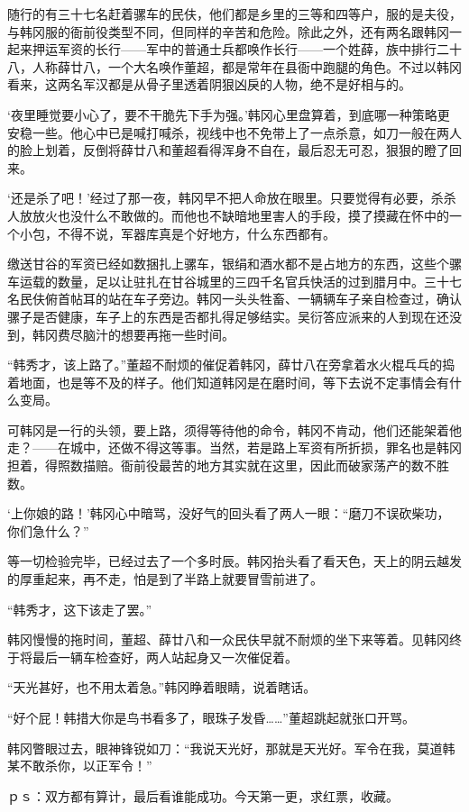 随行的有三十七名赶着骡车的民伕，他们都是乡里的三等和四等户，服的是夫役，与韩冈服的衙前役类型不同，但同样的辛苦和危险。除此之外，还有两名跟韩冈一起来押运军资的长行——军中的普通士兵都唤作长行——一个姓薛，族中排行二十八，人称薛廿八，一个大名唤作董超，都是常年在县衙中跑腿的角色。不过以韩冈看来，这两名军汉都是从骨子里透着阴狠凶戾的人物，绝不是好相与的。

‘夜里睡觉要小心了，要不干脆先下手为强。’韩冈心里盘算着，到底哪一种策略更安稳一些。他心中已是喊打喊杀，视线中也不免带上了一点杀意，如刀一般在两人的脸上划着，反倒将薛廿八和董超看得浑身不自在，最后忍无可忍，狠狠的瞪了回来。

‘还是杀了吧！’经过了那一夜，韩冈早不把人命放在眼里。只要觉得有必要，杀杀人放放火也没什么不敢做的。而他也不缺暗地里害人的手段，摸了摸藏在怀中的一个小包，不得不说，军器库真是个好地方，什么东西都有。

缴送甘谷的军资已经如数捆扎上骡车，银绢和酒水都不是占地方的东西，这些个骡车运载的数量，足以让驻扎在甘谷城里的三四千名官兵快活的过到腊月中。三十七名民伕俯首帖耳的站在车子旁边。韩冈一头头牲畜、一辆辆车子亲自检查过，确认骡子是否健康，车子上的东西是否都扎得足够结实。吴衍答应派来的人到现在还没到，韩冈费尽脑汁的想要再拖一些时间。

“韩秀才，该上路了。”董超不耐烦的催促着韩冈，薛廿八在旁拿着水火棍乓乓的捣着地面，也是等不及的样子。他们知道韩冈是在磨时间，等下去说不定事情会有什么变局。

可韩冈是一行的头领，要上路，须得等待他的命令，韩冈不肯动，他们还能架着他走？——在城中，还做不得这等事。当然，若是路上军资有所折损，罪名也是韩冈担着，得照数描赔。衙前役最苦的地方其实就在这里，因此而破家荡产的数不胜数。

‘上你娘的路！’韩冈心中暗骂，没好气的回头看了两人一眼：“磨刀不误砍柴功，你们急什么？”

等一切检验完毕，已经过去了一个多时辰。韩冈抬头看了看天色，天上的阴云越发的厚重起来，再不走，怕是到了半路上就要冒雪前进了。

“韩秀才，这下该走了罢。”

韩冈慢慢的拖时间，董超、薛廿八和一众民伕早就不耐烦的坐下来等着。见韩冈终于将最后一辆车检查好，两人站起身又一次催促着。

“天光甚好，也不用太着急。”韩冈睁着眼睛，说着瞎话。

“好个屁！韩措大你是鸟书看多了，眼珠子发昏……”董超跳起就张口开骂。

韩冈瞥眼过去，眼神锋锐如刀：“我说天光好，那就是天光好。军令在我，莫道韩某不敢杀你，以正军令！”

ｐｓ：双方都有算计，最后看谁能成功。今天第一更，求红票，收藏。

